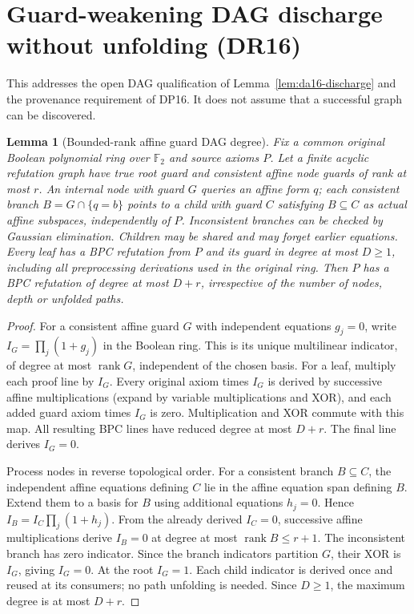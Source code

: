 \documentclass[11pt]{article}
\newtheorem{lemma}[theorem]{Lemma}
\begin{document}
\section{Guard-weakening DAG discharge without unfolding (DR16)}\label{sec:dr16}
This addresses the open DAG qualification of Lemma~\ref{lem:da16-discharge} and the provenance requirement of DP16. It does not assume that a successful graph can be discovered.

\begin{lemma}[Bounded-rank affine guard DAG degree]\label{lem:dr16-dag}
Fix a common original Boolean polynomial ring over $\mathbb F_2$ and source axioms $P$. Let a finite acyclic refutation graph have true root guard and consistent affine node guards of rank at most $r$. An internal node with guard $G$ queries an affine form $q$; each consistent branch $B=G\cap\{q=b\}$ points to a child with guard $C$ satisfying $B\subseteq C$ as actual affine subspaces, independently of $P$. Inconsistent branches can be checked by Gaussian elimination. Children may be shared and may forget earlier equations. Every leaf has a BPC refutation from $P$ and its guard in degree at most $D\ge1$, including all preprocessing derivations used in the original ring. Then $P$ has a BPC refutation of degree at most $D+r$, irrespective of the number of nodes, depth or unfolded paths.
\end{lemma}
\begin{proof}
For a consistent affine guard $G$ with independent equations $g_j=0$, write $I_G=\prod_j(1+g_j)$ in the Boolean ring. This is its unique multilinear indicator, of degree at most $\operatorname{rank}G$, independent of the chosen basis. For a leaf, multiply each proof line by $I_G$. Every original axiom times $I_G$ is derived by successive affine multiplications (expand by variable multiplications and XOR), and each added guard axiom times $I_G$ is zero. Multiplication and XOR commute with this map. All resulting BPC lines have reduced degree at most $D+r$. The final line derives $I_G=0$.

Process nodes in reverse topological order. For a consistent branch $B\subseteq C$, the independent affine equations defining $C$ lie in the affine equation span defining $B$. Extend them to a basis for $B$ using additional equations $h_j=0$. Hence $I_B=I_C\prod_j(1+h_j)$. From the already derived $I_C=0$, successive affine multiplications derive $I_B=0$ at degree at most $\operatorname{rank}B\le r+1$. The inconsistent branch has zero indicator. Since the branch indicators partition $G$, their XOR is $I_G$, giving $I_G=0$. At the root $I_G=1$. Each child indicator is derived once and reused at its consumers; no path unfolding is needed. Since $D\ge1$, the maximum degree is at most $D+r$.
\end{proof}
\end{document}
